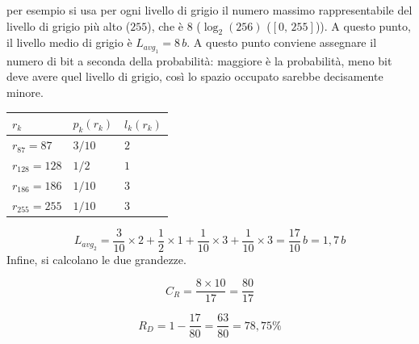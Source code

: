 per esempio si usa per ogni livello di grigio il numero massimo rappresentabile del livello di grigio più alto ($255$), che è $8$ ($\log_{2}{(256)}$ ($[0, \, 255]$)). A questo punto, il
livello medio di grigio è $L_{avg_{1}}=8\, b$. A questo punto conviene assegnare il numero di bit a seconda della probabilità: maggiore è la probabilità,
meno bit deve avere quel livello di grigio, così lo spazio occupato sarebbe decisamente minore.
\begin{table}[H] %
    \centering
    \begin{tabular}{| C{5cm} | C{5cm} | C{5cm}|} 
            \hline
            
            \textbf{$r_k$} & \textbf{$p_k(r_k)$} & \textbf{$l_k(r_k)$} \\ 
            \hline %
            $r_{87}=87$ & $3/10$ & $2$\\
            \hline %
            $r_{128}=128$ & $1/2$ & $1$\\
            \hline %
            $r_{186}=186$ & $1/10$ & $3$\\
            \hline %
            $r_{255}=255$ & $1/10$ & $3$ \\
            \hline %
    \end{tabular}
\end{table}
\begin{equation*}
    L_{avg_{2}}=\frac{3}{10}\times 2 + \frac{1}{2}\times 1 + \frac{1}{10} \times 3 + \frac{1}{10} \times 3 = \frac{17}{10} \, b = 1,7\, b
\end{equation*}
Infine, si calcolano le due grandezze.
\begin{center}
\begin{minipage}{0.48\textwidth} %
    \centering
    \begin{equation*}
        C_R = \frac{8\times10}{17}=\frac{80}{17}
    \end{equation*}
\end{minipage}
\hfill %
\begin{minipage}{0.48\textwidth} %
    \centering
    \begin{equation*}
        R_D = 1 - \frac{17}{80} = \frac{63}{80} = 78,75\%
    \end{equation*}
\end{minipage}
\end{center}
